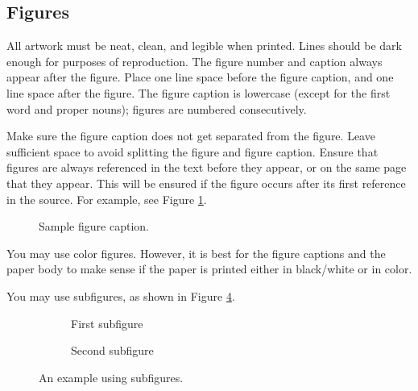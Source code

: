 \documentclass[10pt]{article} %
\begin{document}
\subsection{Figures}
\label{sec:figures}
All artwork must be neat, clean, and legible when printed. Lines should be dark enough for purposes of reproduction. The figure number and caption always appear after the figure. Place one line space before the figure caption, and one line space after the figure. The figure caption is lowercase (except for the first word and proper nouns); figures are numbered consecutively.

Make sure the figure caption does not get separated from the figure. Leave sufficient space to avoid splitting the figure and figure caption. Ensure that figures are always referenced in the text before they appear, or on the same page that they appear. This will be ensured if the figure occurs after its first reference in the source. For example, see Figure \ref{fig:example}.

\begin{figure}[ht]
    \begin{center}
        \fbox{\rule[-.5cm]{0cm}{4cm} \rule[-.5cm]{4cm}{0cm}}
    \end{center}
    \caption{Sample figure caption.}
    \label{fig:example}
\end{figure}

You may use color figures. However, it is best for the figure captions and the paper body to make sense if the paper is printed either in black/white or in color.

You may use subfigures, as shown in Figure \ref{fig:subfigureExample}.

\begin{figure}[htbp]
    \centering
    \begin{subfigure}[b]{0.45\textwidth}
        \centering
        \fbox{\rule[-.5cm]{0cm}{4cm} \rule[-.5cm]{4cm}{0cm}} %
        \caption{First subfigure}
        \label{fig:sub1}
    \end{subfigure}
    \hfill
    \begin{subfigure}[b]{0.45\textwidth}
        \centering
        \fbox{\rule[-.5cm]{0cm}{4cm} \rule[-.5cm]{4cm}{0cm}} %
        \caption{Second subfigure}
        \label{fig:sub2}
    \end{subfigure}
    \caption{An example using subfigures.}
    \label{fig:subfigureExample}
\end{figure}
\end{document}
